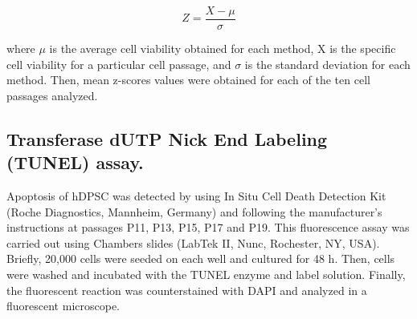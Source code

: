 \documentclass[a4paper,twocolumn,12pt]{article}
\begin{document}
$$Z=\frac{X-\mu}{\sigma}$$
 
where $\mu$ is the average cell viability obtained for each method, X is the specific cell viability for a particular cell passage, and $\sigma$ is the standard deviation for each method. Then, mean z-scores values were obtained for each of the ten cell passages analyzed.

\subsection{Transferase dUTP Nick End Labeling (TUNEL) assay.}
Apoptosis of hDPSC was detected by using In Situ Cell Death Detection Kit (Roche Diagnostics, Mannheim, Germany) and following the manufacturer's instructions at passages P11, P13, P15, P17 and P19. This fluorescence assay was carried out using Chambers slides (LabTek II, Nunc, Rochester, NY, USA). Briefly, 20,000 cells were seeded on each well and cultured for 48 h. Then, cells were washed and incubated with the TUNEL enzyme and label solution. Finally, the fluorescent reaction was counterstained with DAPI and analyzed in a fluorescent microscope.\\
\end{document}
